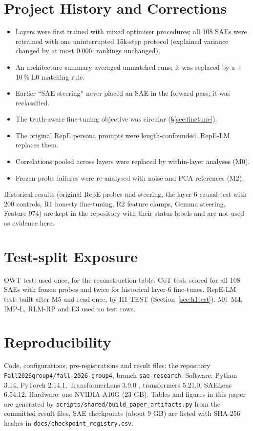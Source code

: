 \section{Project History and Corrections}\label{app:history}

\begin{itemize}
  \item Layers were first trained with mixed optimiser procedures; all 108 SAEs were retrained with one uninterrupted
        15k-step protocol (explained variance changed by at most 0.006; rankings unchanged).
  \item An architecture summary averaged unmatched runs; it was replaced by a $\pm$10\,\% L0 matching rule.
  \item Earlier ``SAE steering'' never placed an SAE in the forward pass; it was reclassified.
  \item The truth-aware fine-tuning objective was circular (\S\ref{sec:finetune}).
  \item The original RepE persona prompts were length-confounded; RepE-LM replaces them.
  \item Correlations pooled across layers were replaced by within-layer analyses (M0).
  \item Frozen-probe failures were re-analysed with noise and PCA references (M2).
\end{itemize}
Historical results (original RepE probes and steering, the layer-6 causal test with 200 controls, R1 honesty
fine-tuning, R2 feature clamps, Gemma steering, Feature 974) are kept in the repository with their status labels and
are not used as evidence here.

\section{Test-split Exposure}\label{app:exposure}
OWT test: used once, for the reconstruction table. GoT test: scored for all 108 SAEs with frozen probes and twice for
historical layer-6 fine-tunes. RepE-LM test: built after M5 and read once, by H1-TEST (Section~\ref{sec:h1test}). M0--M4, IMP-L, RLM-RP and E3 used no test rows.

\section{Reproducibility}\label{app:repro}
Code, configurations, pre-registrations and result files: the repository\\ \texttt{Fall2026group4/\allowbreak{}fall-2026-group4}, branch
\texttt{sae-research}. Software: Python 3.14, PyTorch 2.14.1, TransformerLens 3.9.0 \citep{transformerlens2022},
transformers 5.21.0, SAELens 6.54.12. Hardware: one NVIDIA A10G (23 GB). Tables and figures in this paper are generated
by \texttt{scripts/\allowbreak{}shared/\allowbreak{}build\_paper\_artifacts.py} from the committed result files. SAE checkpoints (about 9 GB)
are listed with SHA-256 hashes in \texttt{docs/\allowbreak{}checkpoint\_registry.csv}.

